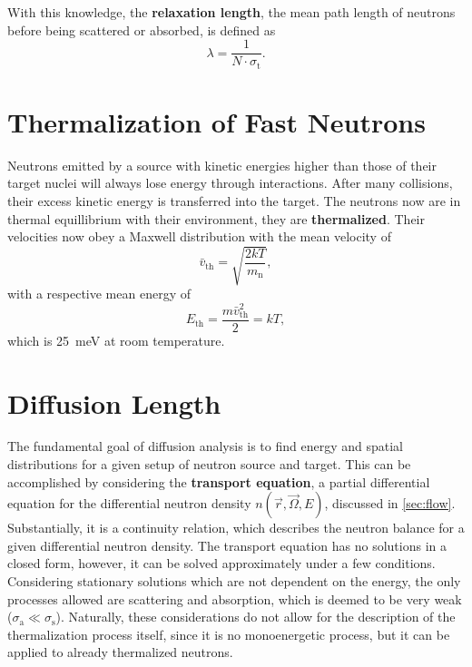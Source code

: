 With this knowledge, the \textbf{relaxation length}, the mean path length of neutrons before being scattered or absorbed, is defined as
\begin{equation*}
	\lambda = \frac{1}{N\cdot\sigma_\text{t}}.
\end{equation*}

\section{Thermalization of Fast Neutrons}
Neutrons emitted by a source with kinetic energies higher than those of their target nuclei will always lose energy through interactions.
After many collisions, their excess kinetic energy is transferred into the target.
The neutrons now are in thermal equillibrium with their environment, they are \textbf{thermalized}.
Their velocities now obey a Maxwell distribution with the mean velocity of
\begin{equation*}
	\bar{v}_\text{th}=\sqrt{\frac{2kT}{m_\text{n}}},
\end{equation*}
with a respective mean energy of
\begin{equation*}
	E_\text{th}=\frac{m\bar{v}_\text{th}^2}{2} = kT,
\end{equation*}
which is \SI{25}{\meV} at room temperature.

\section{Diffusion Length}
The fundamental goal of diffusion analysis is to find energy and spatial distributions for a given setup of neutron source and target.
This can be accomplished by considering the \textbf{transport equation}, a partial differential equation for the differential neutron density $n(\vec{r}, \vec{\Omega}, E)$, discussed in \autoref{sec:flow}.
Substantially, it is a continuity relation, which describes the neutron balance for a given differential neutron density.
The transport equation has no solutions in a closed form, however, it can be solved approximately under a few conditions.
Considering stationary solutions which are not dependent on the energy, the only processes allowed are scattering and absorption, which is deemed to be very weak ($\sigma_\text{a}\ll \sigma_\text{s}$).
Naturally, these considerations do not allow for the description of the thermalization process itself, since it is no monoenergetic process, but it can be applied to already thermalized neutrons.

